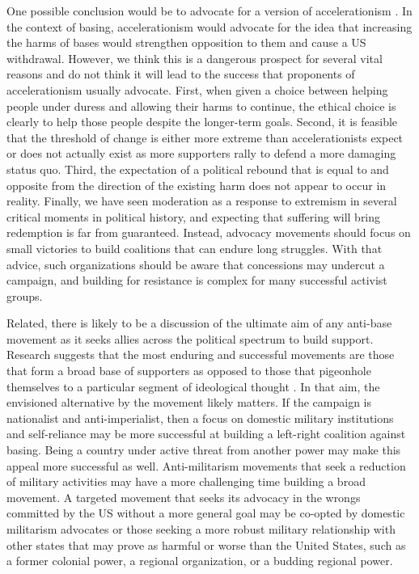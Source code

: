 One possible conclusion would be to advocate for a version of accelerationism \cite{laurence2017}. In the context of basing, accelerationism would advocate for the idea that increasing the harms of bases would strengthen opposition to them and cause a US withdrawal. However, we think this is a dangerous prospect for several vital reasons and do not think it will lead to the success that proponents of accelerationism usually advocate. First, when given a choice between helping people under duress and allowing their harms to continue, the ethical choice is clearly to help those people despite the longer-term goals. Second, it is feasible that the threshold of change is either more extreme than accelerationists expect or does not actually exist as more supporters rally to defend a more damaging status quo. Third, the expectation of a political rebound that is equal to and opposite from the direction of the existing harm does not appear to occur in reality. Finally, we have seen moderation as a response to extremism in several critical moments in political history, and expecting that suffering will bring redemption is far from guaranteed. Instead, advocacy movements should focus on small victories to build coalitions that can endure long struggles. With that advice, such organizations should be aware that concessions may undercut a campaign, and building for resistance is complex for many successful activist groups. 

Related, there is likely to be a discussion of the ultimate aim of any anti-base movement as it seeks allies across the political spectrum to build support. Research suggests that the most enduring and successful movements are those that form a broad base of supporters as opposed to those that pigeonhole themselves to a particular segment of ideological thought \cite{Yeo2011}. In that aim, the envisioned alternative by the movement likely matters. If the campaign is nationalist and anti-imperialist, then a focus on domestic military institutions and self-reliance may be more successful at building a left-right coalition against basing. Being a country under active threat from another power may make this appeal more successful as well. Anti-militarism movements that seek a reduction of military activities may have a more challenging time building a broad movement. A targeted movement that seeks its advocacy in the wrongs committed by the US without a more general goal may be co-opted by domestic militarism advocates or those seeking a more robust military relationship with other states that may prove as harmful or worse than the United States, such as a former colonial power, a regional organization, or a budding regional power. %

